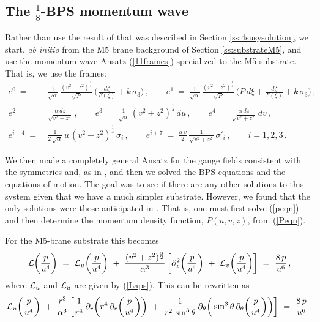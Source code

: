 \documentclass[11pt]{article}
\def\nca{{\zeta}}
\def\ncb{{\xi}}
\def\nBPS#1{$\frac{1}{#1}$-BPS}
\numberwithin{equation}{section}
\begin{document}
\subsection{The \nBPS{8} momentum wave}
\label{ss:M5wave}

Rather than use the result of \cite{Bena:2024qed} that was described in  Section \ref{ss:4susysolution}, we start, {\it ab initio} from the M5 brane background of Section \ref{ss:substrateM5}, and use the momentum wave Ansatz  (\ref{11frames}) specialized to the M5 substrate.  That is, we use the frames:
%
\begin{equation}
\begin{aligned}
e^0 ~=~  &\frac{1}{\sqrt{\alpha} } \, \frac{ (v^2 +z^2)^{\frac{1}{4}}}{\sqrt{P} }\,\bigg( \frac{ d \nca}{F(\ncb) } + k \,  \sigma_3  \bigg)  \,, \qquad e^1~=~    \frac{1}{\sqrt{\alpha} } \, \frac{ (v^2 +z^2)^{\frac{1}{4}}}{\sqrt{P} }\, \bigg(P \,  d  \ncb    +   \frac{ d \nca}{F(\ncb) } + k \,  \sigma_3 \bigg)   \,, \\ e^2 ~=~ &\frac{ \alpha \,  dz }{\sqrt{ v^2 +z^2} }  \,,  \qquad e^3 ~=~\frac{1}{\sqrt{\alpha} } \, (v^2 +z^2)^{\frac{1}{4}}\,   du  \,,   \qquad e^4 ~=~  \frac{ \alpha \,  dz }{\sqrt{ v^2 +z^2} }  \,  dv \,,\\
e^{i+4}~=~  & \frac{1}{2\,\sqrt{\alpha} } \,u\, (v^2 +z^2)^{\frac{1}{4}}\,    \sigma_i  \,, \qquad e^{i+7} ~=~ \frac{\alpha \,  v }{2 } \, \frac{ 1 }{\sqrt{ v^2 +z^2} }  \, {\sigma'}_i \,,   \qquad {i = 1,2,3}       \,.
\end{aligned}
 \label{11framesM5}
\end{equation}
%

We  then made a completely general Ansatz for the gauge fields consistent with the symmetries and, as in  \cite{Bena:2024qed}, and then we solved the BPS equations and the equations of motion.  The goal was  to see if there are any other solutions to this system given that we have a much simpler substrate.  However, we found that the only  solutions were those anticipated in   \cite{Bena:2024qed}.  That is, one must first solve (\ref{peqn}) and then determine the momentum density function, $P(u,v,z)$, from  (\ref{Peqn}).  

For the M5-brane substrate this becomes
%
\begin{equation}
{\cal L} \bigg( \frac{p}{u^4} \bigg) ~=~  {\cal L}_u  \bigg( \frac{p}{u^4} \bigg) ~+~\frac{(v^2 +z^2)^{\frac{3}{2}}}{\alpha^3} \,  \bigg[ \partial_z^2 \bigg( \frac{p}{u^4} \bigg) ~+~{\cal L}_v  \bigg( \frac{p}{u^4} \bigg) \bigg]~=~  \frac{8\,p}{u^6} \,,
 \label{peqn-simp1}
\end{equation}
%
where  ${\cal L}_u$ and ${\cal L}_u$ are given by (\ref{Laps}).   This can be rewritten as
%
\begin{equation}
{\cal L}_u  \bigg( \frac{p}{u^4} \bigg) ~+~\frac{r^3}{\alpha^3} \,  \bigg[\frac{1}{r^4} \, \partial_r  \bigg(r^ 4\, \partial_r \bigg( \frac{p}{u^4} \bigg) \bigg)  ~+~\frac{1}{r^2 \, \sin^3 \theta } \, \partial_\theta \bigg(\sin^3 \theta \, \partial_\theta \bigg( \frac{p}{u^4} \bigg) \bigg)  \bigg]~=~  \frac{8\,p}{u^6} \,.
 \label{peqn-simp3}
\end{equation}
%
\end{document}

